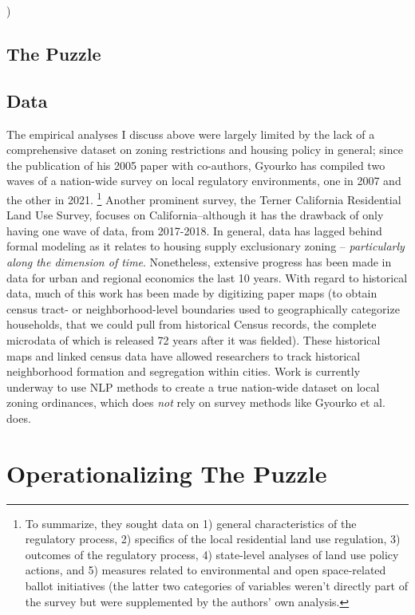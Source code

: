 )\documentclass{article}[11pt]
\begin{document}
	\subsection{The Puzzle}



	\subsection{Data}
The empirical analyses I discuss above were largely limited by the lack of a comprehensive dataset on zoning restrictions and housing policy in general; since the publication of his 2005 paper with co-authors, Gyourko has compiled two waves of a nation-wide survey on local regulatory environments, one in 2007 and the other in 2021. \citep{gyourko2008new} \citep{gyourko2021local} \footnote{To summarize, they sought data on 1) general characteristics of the regulatory process, 2) specifics of the local residential land use regulation, 3) outcomes of the regulatory process, 4) state-level analyses of land use policy actions, and 5) measures related to environmental and open space-related ballot initiatives (the latter two categories of variables weren't directly part of the survey but were supplemented by the authors' own analysis.} Another prominent survey, the Terner California Residential Land Use Survey, focuses on California--although it has the drawback of only having one wave of data, from 2017-2018. \citep{mawhorter2018terner} In general, data has lagged behind formal modeling as it relates to housing supply exclusionary zoning -- \textit{particularly along the dimension of time}. \citep{gyourko2015regulation} Nonetheless, extensive progress has been made in data for urban and regional economics the last 10 years. \citep{newdata} With regard to historical data, much of this work has been made by digitizing paper maps (to obtain census tract- or neighborhood-level boundaries used to geographically categorize households, that we could pull from historical Census records, the complete microdata of which is released 72 years after it was fielded). These historical maps and linked census data have allowed researchers to track historical neighborhood formation and segregation within cities. Work is currently underway to use NLP methods to create a true nation-wide dataset on local zoning ordinances, which does \textit{not} rely on survey methods like Gyourko et al. does. \citep{bartik2024costs} 

\section{Operationalizing The Puzzle}
\end{document}
